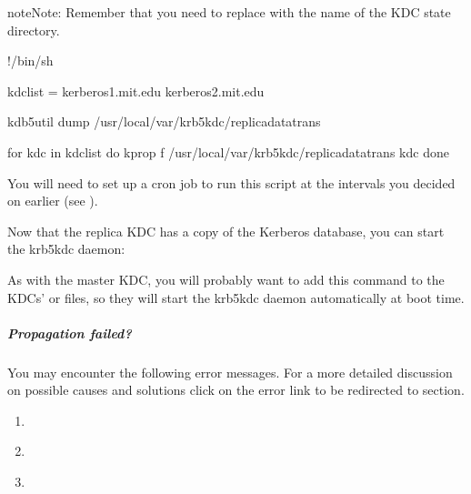 \documentclass[letterpaper,10pt,english]{sphinxmanual}
\begin{document}
\begin{sphinxadmonition}{note}{Note:}
Remember that you need to replace 
with the name of the KDC state directory.
\end{sphinxadmonition}

%
\begin{sphinxVerbatim}[commandchars=\\\{\}]
\PYGZsh{}!/bin/sh

kdclist = \PYGZdq{}kerberos\PYGZhy{}1.mit.edu kerberos\PYGZhy{}2.mit.edu\PYGZdq{}

kdb5\PYGZus{}util dump /usr/local/var/krb5kdc/replica\PYGZus{}datatrans

for kdc in \PYGZdl{}kdclist
do
    kprop \PYGZhy{}f /usr/local/var/krb5kdc/replica\PYGZus{}datatrans \PYGZdl{}kdc
done
\end{sphinxVerbatim}

You will need to set up a cron job to run this script at the intervals
you decided on earlier (see {\hyperref[\detokenize{admin/realm_config:db-prop}]{}}).

Now that the replica KDC has a copy of the Kerberos database, you can
start the krb5kdc daemon:

%
\begin{sphinxVerbatim}[commandchars=\\\{\}]
 
\end{sphinxVerbatim}

As with the master KDC, you will probably want to add this command to
the KDCs’  or  files, so they will start
the krb5kdc daemon automatically at boot time.


\subparagraph{Propagation failed?}
\label{\detokenize{admin/install_kdc:propagation-failed}}
You may encounter the following error messages. For a more detailed
discussion on possible causes and solutions click on the error link
to be redirected to {\hyperref[\detokenize{admin/troubleshoot:troubleshoot}]{}} section.
\begin{enumerate}
\item {} 
{\hyperref[\detokenize{admin/troubleshoot:kprop-no-route}]{}}

\item {} 
{\hyperref[\detokenize{admin/troubleshoot:kprop-con-refused}]{}}

\item {} 
{\hyperref[\detokenize{admin/troubleshoot:kprop-sendauth-exchange}]{}}

\end{enumerate}
\end{document}
